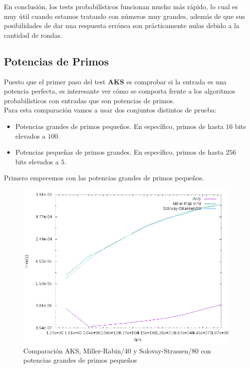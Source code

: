 En conclusión, los tests probabilísticos funcionan mucho más rápido, lo cual es muy útil cuando estamos tratando con números muy grandes, además de que sus posibilidades de dar una respuesta errónea son prácticamente nulas debido a la cantidad de rondas.

\subsection{Potencias de Primos}

Puesto que el primer paso del test \textbf{AKS} es comprobar si la entrada es una potencia perfecta, es interesante ver cómo se comporta frente a los algoritmos probabilísticos con entradas que son potencias de primos.\\

Para esta comparación vamos a usar dos conjuntos distintos de prueba:

\begin{itemize}
	\item Potencias grandes de primos pequeños. En específico, primos de hasta $16$ bits elevados a $100$.
	
	\item Potencias pequeñas de primos grandes. En específico, primos de hasta $256$ bits elevados a $5$.
\end{itemize}

Primero empecemos con las potencias grandes de primos pequeños.

\begin{figure}[H]
	\centering
	\includegraphics[totalheight=12cm]{img/graphs/aks-probs-powers-100-mean}
	\caption{Comparación AKS, Miller-Rabin/40 y Solovay-Strassen/80 con potencias grandes de primos pequeños}
\end{figure}

